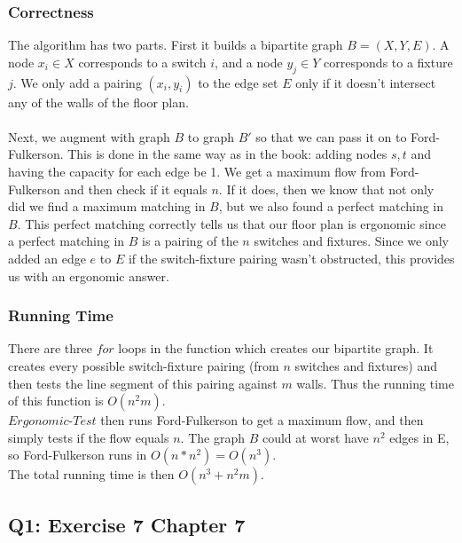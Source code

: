 \documentclass[12pt, oneside]{article}
\begin{document}
\subsubsection*{Correctness}
The algorithm has two parts. First it builds a bipartite graph $B = (X,Y,E)$. A node $x_i \in X$ corresponds to a switch $i$, and a node $y_j \in Y$ corresponds to a fixture $j$. We only add a pairing $(x_i,y_i)$ to the edge set $E$ only if it doesn't intersect any of the walls of the floor plan.\\\\
Next, we augment with graph $B$ to graph $B'$ so that we can pass it on to Ford-Fulkerson. This is done in the same way as in the book: adding nodes $s,t$ and having the capacity for each edge be 1. We get a maximum flow from Ford-Fulkerson and then check if it equals $n$. If it does, then we know that not only did we find a maximum matching in $B$, but we also found a perfect matching in $B$. This perfect matching correctly tells us that our floor plan is ergonomic since a perfect matching in $B$ is a pairing of the $n$ switches and fixtures. Since we only added an edge $e$ to $E$ if the switch-fixture pairing wasn't obstructed, this provides us with an ergonomic answer.\\

\subsubsection*{Running Time}
There are three $for$ loops in the function which creates our bipartite graph. It creates every possible switch-fixture pairing (from $n$ switches and fixtures) and then tests the line segment of this pairing against $m$ walls. Thus the running time of this function is $O(n^2m)$.\\
$Ergonomic$-$Test$ then runs Ford-Fulkerson to get a maximum flow, and then simply tests if the flow equals $n$. The graph $B$ could at worst have $n^2$ edges in E, so Ford-Fulkerson runs in $O(n*n^2) = O(n^3)$.\\
The total running time is then $O(n^3 + n^2m)$.\\

\subsection*{Q1: Exercise 7 Chapter 7}
\end{document}

